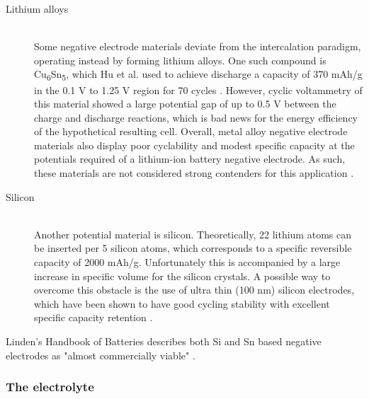 \documentclass[12pt]{article} %
\begin{document}
\begin{description}
\item[Lithium alloys] \hfill \\
Some negative electrode materials deviate from the intercalation paradigm, operating instead by forming lithium alloys.
One such compound is Cu\textsubscript{6}Sn\textsubscript{5}, which Hu et al. used to achieve discharge a capacity of 370 mAh/g in the 0.1 V to 1.25 V region for 70 cycles \cite{hu_cyclic_2009}.
However, cyclic voltammetry of this material showed a large potential gap of up to 0.5 V between the charge and discharge reactions, which is bad news for the energy efficiency of the hypothetical resulting cell.
Overall, metal alloy negative electrode materials also display poor cyclability and modest specific capacity at the potentials required of a lithium-ion battery negative electrode.
As such, these materials are not considered strong contenders for this application \cite{kulova_new_2013}.

\item[Silicon] \hfill \\

Another potential material is silicon.
Theoretically, 22 lithium atoms can be inserted per 5 silicon atoms, which corresponds to a specific reversible capacity of 2000 mAh/g.
Unfortunately this is accompanied by a large increase in specific volume for the silicon crystals.
A possible way to overcome this obstacle is the use of ultra thin (\mytilde{}100 nm) silicon electrodes, which have been shown to have good cycling stability with excellent specific capacity retention \cite{kulova_new_2013}.
 
\end{description} 

Linden's Handbook of Batteries describes both Si and Sn based negative electrodes as "almost commercially viable" \cite{reddy_thomas_section_2011-2}.


\subsubsection{The electrolyte} %
\end{document}
